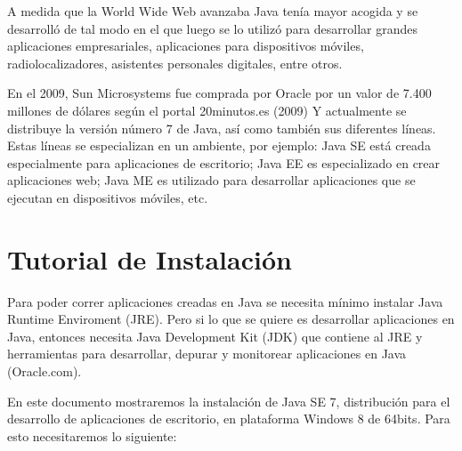 \documentclass[12pt]{book} %
\begin{document}
A medida que la World Wide Web avanzaba Java tenía mayor acogida y se desarrolló de tal modo en el que luego se lo utilizó para desarrollar grandes aplicaciones empresariales, aplicaciones para dispositivos móviles, radiolocalizadores, asistentes personales digitales, entre otros. 

En el 2009, Sun Microsystems fue comprada por Oracle por un valor de 7.400 millones de dólares según el portal 20minutos.es (2009) Y actualmente se distribuye la versión número 7 de Java, así como también sus diferentes líneas. Estas líneas se especializan en un ambiente, por ejemplo: Java SE está creada especialmente para aplicaciones de escritorio; Java EE es especializado en crear aplicaciones web; Java ME es utilizado para desarrollar aplicaciones que se ejecutan en dispositivos móviles, etc.



\chapter{Tutorial de Instalación}
Para poder correr aplicaciones creadas en Java se necesita mínimo instalar Java Runtime Enviroment (JRE). Pero si lo que se quiere es desarrollar aplicaciones en Java, entonces necesita Java Development Kit (JDK) que contiene al JRE y herramientas para desarrollar, depurar y monitorear aplicaciones en Java (Oracle.com).

En este documento mostraremos la instalación  de Java SE 7, distribución para el desarrollo de aplicaciones de escritorio, en plataforma Windows 8 de 64bits. Para esto necesitaremos lo siguiente:
\end{document}
